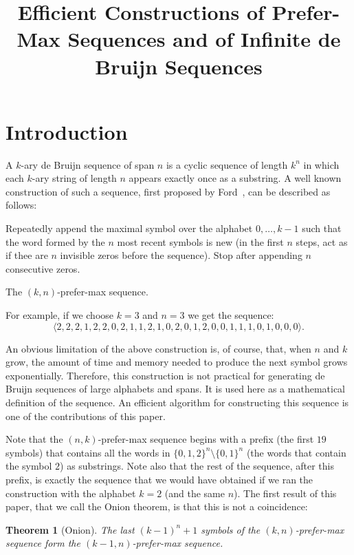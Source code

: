 \documentclass{article}
\title{Efficient Constructions of Prefer-Max Sequences and of Infinite de Bruijn Sequences}
\author{}
\newtheorem{theorem}{Theorem}
\theoremstyle{definition}
\begin{document}
\maketitle

\section{Introduction}

A $k$-ary de Bruijn sequence of span $n$ is a cyclic sequence of length $k^n$ in which each $k$-ary string of length $n$ appears exactly once as
a substring. A well known construction of such a sequence, first proposed by Ford~\cite{Ford1957}, can be described as follows:

\begin{algorithm}
Repeatedly append the maximal symbol over the alphabet $0,\dots,k-1$ such that the word formed by the $n$ most recent symbols is new (in the first $n$ steps, act as if thee are $n$ invisible zeros before the sequence). Stop after appending $n$ consecutive zeros. 
\caption{The $(k,n)$-prefer-max sequence.}
\label{pref-max}
\end{algorithm}


For example, if we choose $k=3$ and $n=3$ we get the sequence:
$$\langle2,2,2,1,2,2,0,2,1,1,2,1,0,2,0,1,2,0,0,1,1,1,0,1,0,0,0\rangle.$$


An obvious limitation of the above construction is, of course, that, when $n$ and $k$ grow, the amount of time and memory needed to produce the next symbol grows exponentially. Therefore, this construction is not practical for generating de Bruijn sequences of large alphabets and spans. It is used here as a mathematical definition of the sequence. An efficient algorithm for constructing this sequence is one of the contributions of this paper.

Note that the $(n,k)$-prefer-max sequence begins with a prefix (the first $19$ symbols) that contains all the words in $\{0,1,2\}^n \setminus \{0,1\}^n$  (the words that contain the symbol $2$) as substrings. Note also that the rest of the sequence, after this prefix, is exactly the sequence that we would have obtained if we ran the construction with the alphabet $k=2$ (and the same $n$). The first result of this paper, that we call the Onion theorem, is that this is not a coincidence:

\begin{theorem}[Onion]
	The last $(k-1)^n+1$ symbols of the $(k,n)$-prefer-max sequence form the $(k-1,n)$-prefer-max sequence.
\label{thm:onion}
\end{theorem} 
\end{document}
